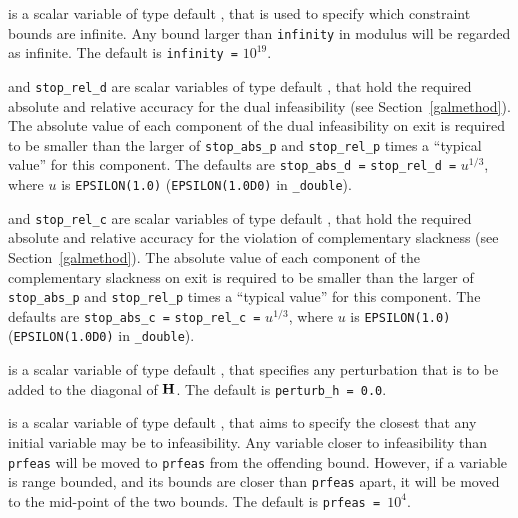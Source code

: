 \begin{description}
 is a scalar variable of type default \realdp, that is used to
specify which constraint bounds are infinite.
Any bound larger than {\tt infinity} in modulus will be regarded as infinite.
The default is {\tt infinity =} $10^{19}$.


 and {\tt stop\_rel\_d}
are scalar variables of type default \realdp, that hold the
required absolute and relative accuracy for the dual infeasibility
(see Section~\ref{galmethod}).
The absolute value of each component of the dual infeasibility
on exit is required to be smaller than the larger of {\tt stop\_abs\_p} and
{\tt stop\_rel\_p} times a ``typical value'' for this component.
The defaults are {\tt stop\_abs\_d =} {\tt stop\_rel\_d =} $u^{1/3}$,
where $u$ is {\tt EPSILON(1.0)} ({\tt EPSILON(1.0D0)} in
{\tt \fullpackagename\_double}).

 and {\tt stop\_rel\_c}
are scalar variables of type default \realdp, that hold the
required absolute and relative accuracy
for the violation of complementary slackness
(see Section~\ref{galmethod}).
The absolute value of each component of the complementary slackness
on exit is required to be smaller than the larger of {\tt stop\_abs\_p} and
{\tt stop\_rel\_p} times a ``typical value'' for this component.
The defaults are {\tt stop\_abs\_c =} {\tt stop\_rel\_c =} $u^{1/3}$,
where $u$ is {\tt EPSILON(1.0)} ({\tt EPSILON(1.0D0)} in
{\tt \fullpackagename\_double}).

 is a scalar variable of type default \realdp, that specifies
any perturbation that is to be added to the diagonal of ${\mathbf{H}}$.
The default is {\tt perturb\_h = 0.0}.

 is a scalar variable of type default \realdp, that aims to specify
the closest that any initial variable may be to infeasibility. Any variable
closer to infeasibility than {\tt prfeas} will be moved to {\tt prfeas} from
the offending bound. However, if a variable is range bounded, and its bounds
are closer than {\tt prfeas} apart, it will be moved to the mid-point of the
two bounds.
The default is {\tt prfeas = $10^4$}.


\end{description}
